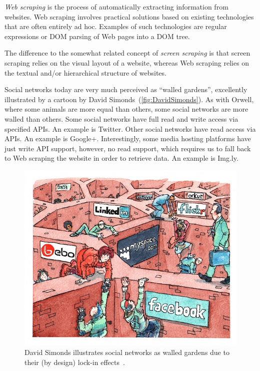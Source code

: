 \documentclass{acm_proc_article-sp}
\let\oldemph\emph
\renewcommand{\emph}[1]{\oldemph{\fontsize{9}{9}\selectfont #1}}
\begin{document}
\emph{Web scraping} is the process of automatically extracting information from websites.
Web scraping involves practical solutions based on existing technologies that are often entirely ad hoc.
Examples of such technologies are regular expressions or DOM parsing of Web pages into a DOM tree.

The difference to the somewhat related concept of \emph{screen scraping} is that screen scraping relies on the visual layout of a website, whereas Web scraping relies on the textual and/or hierarchical structure of websites.

Social networks today are very much perceived as ``walled gardens'', excellently illustrated by a cartoon by David Simonds~(\autoref{fig:DavidSimonds}).
As with Orwell, where some animals are more equal than others, some social networks are more walled than others.
Some social networks have full read and write access via specified APIs.
An example is Twitter.
Other social networks have read access via APIs.
An example is Google+.
Interestingly, some media hosting platforms have just write API support, however, no read support, which requires us to fall back to Web scraping the website in order to retrieve data.
An example is Img.ly.

\begin{figure}
\centering
\includegraphics[width=1.0\linewidth,trim=16px 17px 12px 15px,clip]{./resources/davidsimonds.jpg}
\caption{David Simonds illustrates social networks as walled gardens due to their (by design) lock-in effects~\cite{DavidSimonds}.}
\label{fig:DavidSimonds}
\end{figure}
\end{document}
